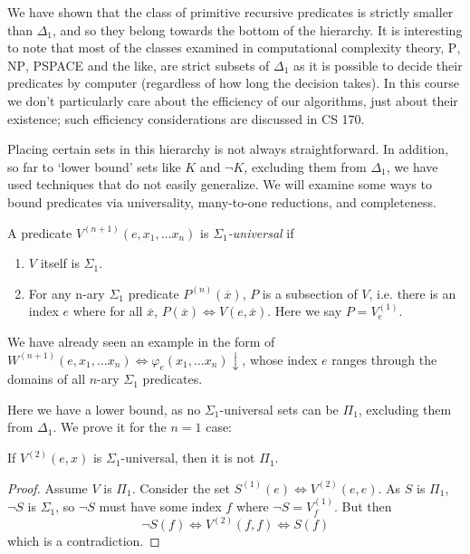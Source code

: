 We have shown that the class of primitive recursive predicates is strictly smaller than $\Delta_1$, and so they belong towards the bottom of the hierarchy. It is interesting to note that most of the classes examined in computational complexity theory, \textsc{P}, \textsc{NP}, \textsc{PSPACE} and the like, are strict subsets of $\Delta_1$ as it is possible to decide their predicates by computer (regardless of how long the decision takes). In this course we don't particularly care about the efficiency of our algorithms, just about their existence; such efficiency considerations are discussed in CS 170.

Placing certain sets in this hierarchy is not always straightforward. In addition, so far to `lower bound' sets like $K$ and $\lnot K$, excluding them from $\Delta_1$, we have used techniques that do not easily generalize. We will examine some ways to bound predicates via universality, many-to-one reductions, and completeness.

\begin{definition}
A predicate $V^{(n+1)}(e, x_1, \ldots x_n)$ is $\Sigma_1$\textit{-universal} if
\begin{enumerate}
    \item $V$ itself is $\Sigma_1$.
    \item For any n-ary $\Sigma_1$ predicate $P^{(n)}(\overline{x})$, $P$ is a subsection of $V$, i.e. there is an index $e$ where for all $\overline{x}$, $P(\overline{x}) \iff V(e, \overline{x})$. Here we say $P = V_e^{(1)}$.
\end{enumerate}
\end{definition}

We have already seen an example in the form of $W^{(n+1)}(e, x_1, \ldots x_n) \iff \varphi_e(x_1, \ldots x_n) \downarrow$, whose index $e$ ranges through the domains of all $n$-ary $\Sigma_1$ predicates.

Here we have a lower bound, as no $\Sigma_1$-universal sets can be $\Pi_1$, excluding them from $\Delta_1$. We prove it for the $n=1$ case:

\begin{proposition}
If $V^{(2)}(e, x)$ is $\Sigma_1$-universal, then it is not $\Pi_1$.
\end{proposition}
\begin{proof}
Assume $V$ is $\Pi_1$. Consider the set $S^{(1)}(e) \iff V^{(2)}(e, e)$. As $S$ is $\Pi_1$, $\lnot S$ is $\Sigma_1$, so $\lnot S$ must have some index $f$ where $\lnot S = V_f^{(1)}$. But then \[
\lnot S(f) \iff V^{(2)}(f,f) \iff S(f)
\]
which is a contradiction.
\end{proof}

